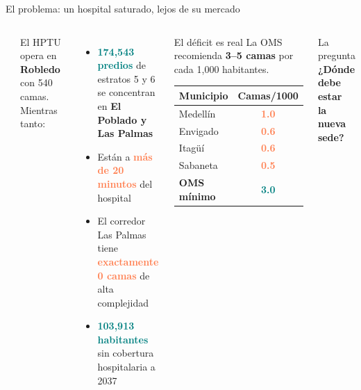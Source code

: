 \documentclass[aspectratio=169, 11pt]{beamer}
\newcommand{\highlight}[1]{\textcolor{teal}{\textbf{#1}}}
\newcommand{\danger}[1]{\textcolor{coral}{\textbf{#1}}}
\begin{document}
{
\begin{frame}{El problema: un hospital saturado, lejos de su mercado}

\begin{columns}[T]
\vspace{6pt}
\begin{center}
\end{center}

\vspace{8pt}
El HPTU opera en \textbf{Robledo} con 540 camas. Mientras tanto:

\vspace{4pt}
\begin{itemize}\small
  \item \highlight{174,543 predios} de estratos 5 y 6 se concentran en \textbf{El Poblado y Las Palmas}
  \item Están a \danger{más de 20 minutos} del hospital
  \item El corredor Las Palmas tiene \danger{exactamente 0 camas} de alta complejidad
  \item \highlight{103,913 habitantes} sin cobertura hospitalaria a 2037
\end{itemize}

\begin{alertblock}{\small El déficit es real}
\footnotesize
La OMS recomienda \textbf{3--5 camas} por cada 1,000 habitantes.

\vspace{4pt}
\begin{tabular}{@{}lc@{}}
\toprule
\textbf{Municipio} & \textbf{Camas/1000} \\
\midrule
\rowcolor{coral!10}
Medellín & \danger{1.0} \\
\rowcolor{coral!8}
Envigado & \danger{0.6} \\
Itagüí & \danger{0.6} \\
Sabaneta & \danger{0.5} \\
\midrule
\textbf{OMS mínimo} & \highlight{3.0} \\
\bottomrule
\end{tabular}
\end{alertblock}

\vspace{6pt}
\begin{exampleblock}{\small La pregunta}
\centering\normalsize
\textbf{¿Dónde debe estar\\la nueva sede?}
\end{exampleblock}
\end{columns}
\end{frame}
}
\end{document}

